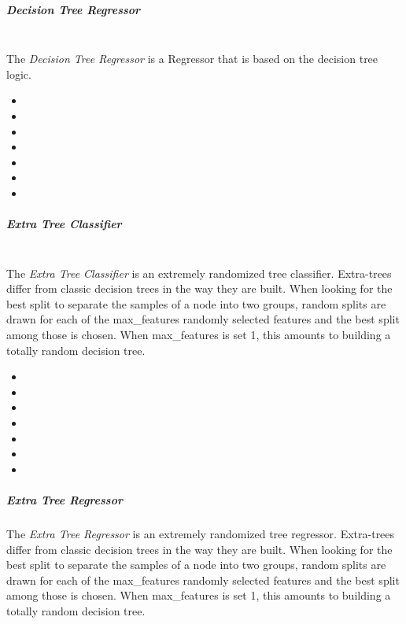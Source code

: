 \subparagraph{Decision Tree Regressor}
\mbox{}
\\The \textit{Decision Tree Regressor} is a Regressor that is based on the
decision tree logic.
%
\begin{itemize}
  \item {}
  \item {}
  \item {}
  \item {}
  \item {}
  \item {}
  \item {}
\end{itemize}

\subparagraph{Extra Tree Classifier}
\mbox{}
\\The \textit{Extra Tree Classifier} is an extremely randomized tree classifier.
%
Extra-trees differ from classic decision trees in the way they are built.
%
When looking for the best split to separate the samples of a node into two
groups, random splits are drawn for each of the max\_features randomly selected
features and the best split among those is chosen.
%
When max\_features is set 1, this amounts to building a totally random decision
tree.


\begin{itemize}
  \item {}
  \item {}
  \item {}
  \item {}
  \item {}
  \item {}
  \item {}
\end{itemize}

\subparagraph{Extra Tree Regressor}
\mbox{}

The \textit{Extra Tree Regressor} is an extremely randomized tree regressor.
%
Extra-trees differ from classic decision trees in the way they are built.
%
When looking for the best split to separate the samples of a node into two
groups, random splits are drawn for each of the max\_features randomly selected
features and the best split among those is chosen.
%
When max\_features is set 1, this amounts to building a totally random decision
tree.

